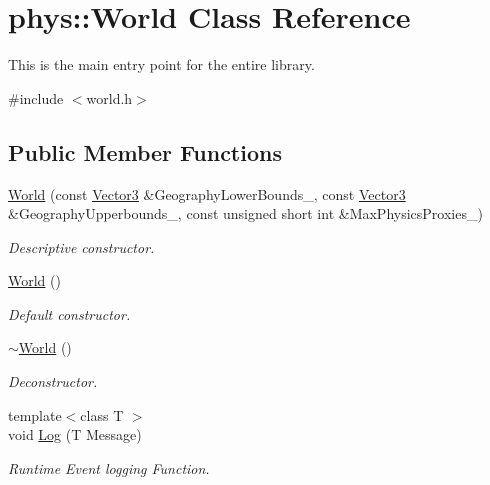 \hypertarget{classphys_1_1World}{
\section{phys::World Class Reference}
\label{da/ddf/classphys_1_1World}
}


This is the main entry point for the entire library.  




{\ttfamily \#include $<$world.h$>$}

\subsection*{Public Member Functions}
\begin{DoxyCompactItemize}
\item 
\hyperlink{classphys_1_1World_aa74e4e6053044c3ecec87fdbf7880c18}{World} (const \hyperlink{classphys_1_1Vector3}{Vector3} \&GeographyLowerBounds\_\-, const \hyperlink{classphys_1_1Vector3}{Vector3} \&GeographyUpperbounds\_\-, const unsigned short int \&MaxPhysicsProxies\_)
\begin{DoxyCompactList}\small\item\em Descriptive constructor. \item\end{DoxyCompactList}\item 
\hyperlink{classphys_1_1World_a7f762724406c874250c3dc8910a1e695}{World} ()
\begin{DoxyCompactList}\small\item\em Default constructor. \item\end{DoxyCompactList}\item 
\hyperlink{classphys_1_1World_a8b2c74c7e5d5ce3c46a814e183a7aff1}{$\sim$World} ()
\begin{DoxyCompactList}\small\item\em Deconstructor. \item\end{DoxyCompactList}\item 
{\footnotesize template$<$class T $>$ }\\void \hyperlink{classphys_1_1World_a05267a20e8d5518771d0848190b33d60}{Log} (T Message)
\begin{DoxyCompactList}\small\item\em Runtime Event logging Function. \item\end{DoxyCompactList}\item 

\end{DoxyCompactItemize}
